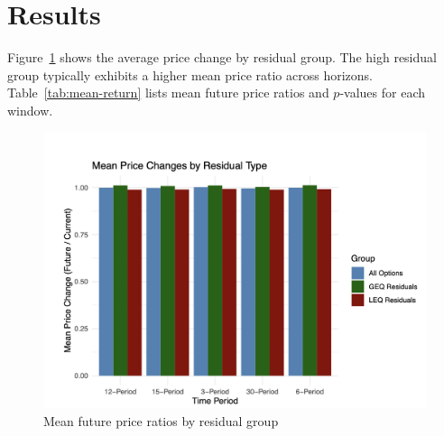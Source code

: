 \documentclass{article}
\begin{document}
\section{Results}
Figure~\ref{fig:price-diff} shows the average price change by residual group. The high residual group typically exhibits a higher mean price ratio across horizons. Table~\ref{tab:mean-return} lists mean future price ratios and $p$-values for each window.
\begin{figure}[h]
  \centering
  \includegraphics[width=0.8\linewidth]{data/results/mean_price_diff.png}
  \caption{Mean future price ratios by residual group}
  \label{fig:price-diff}
\end{figure}
\begin{table}[h]
  \centering
  \caption{Mean future price ratios by residual group and associated $p$-values. * indicates significance at $p = 0.05$.}
  \label{tab:mean-return}
\end{table}
\end{document}

